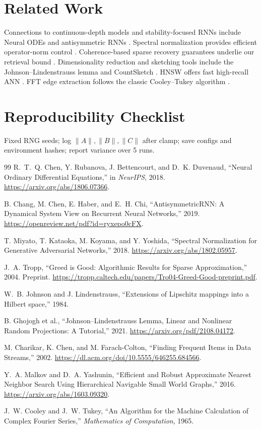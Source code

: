 \documentclass[11pt]{article}
\begin{document}
\section{Related Work}
Connections to continuous-depth models and stability-focused RNNs include Neural ODEs \cite{Chen2018NeuralODE} and antisymmetric RNNs \cite{Chang2019ASRNN}. Spectral normalization provides efficient operator-norm control \cite{Miyato2018SN}. Coherence-based sparse recovery guarantees underlie our retrieval bound \cite{Tropp2004GreedIsGood}. Dimensionality reduction and sketching tools include the Johnson--Lindenstrauss lemma \cite{JL1984,JL_Tutorial2021} and CountSketch \cite{Charikar2002CountSketch}. HNSW offers fast high-recall ANN \cite{Malkov2016HNSW}. FFT edge extraction follows the classic Cooley--Tukey algorithm \cite{CooleyTukey1965}.

\section{Reproducibility Checklist}
Fixed RNG seeds; log $\|A\|,\|B\|,\|C\|$ after clamp; save configs and environment hashes; report variance over 5 runs.

\begin{thebibliography}{99}
 R.~T.~Q. Chen, Y. Rubanova, J. Bettencourt, and D.~K. Duvenaud, ``Neural Ordinary Differential Equations,'' in \emph{NeurIPS}, 2018. \url{https://arxiv.org/abs/1806.07366}.

 B. Chang, M. Chen, E. Haber, and E.~H. Chi, ``AntisymmetricRNN: A Dynamical System View on Recurrent Neural Networks,'' 2019. \url{https://openreview.net/pdf?id=ryxepo0cFX}.

 T. Miyato, T. Kataoka, M. Koyama, and Y. Yoshida, ``Spectral Normalization for Generative Adversarial Networks,'' 2018. \url{https://arxiv.org/abs/1802.05957}.

 J.~A. Tropp, ``Greed is Good: Algorithmic Results for Sparse Approximation,'' 2004. Preprint. \url{https://tropp.caltech.edu/papers/Tro04-Greed-Good-preprint.pdf}.

 W.~B. Johnson and J. Lindenstrauss, ``Extensions of Lipschitz mappings into a Hilbert space,'' 1984.

 B. Ghojogh et al., ``Johnson--Lindenstrauss Lemma, Linear and Nonlinear Random Projections: A Tutorial,'' 2021. \url{https://arxiv.org/pdf/2108.04172}.

 M. Charikar, K. Chen, and M. Farach-Colton, ``Finding Frequent Items in Data Streams,'' 2002. \url{https://dl.acm.org/doi/10.5555/646255.684566}.

 Y.~A. Malkov and D.~A. Yashunin, ``Efficient and Robust Approximate Nearest Neighbor Search Using Hierarchical Navigable Small World Graphs,'' 2016. \url{https://arxiv.org/abs/1603.09320}.

 J.~W. Cooley and J.~W. Tukey, ``An Algorithm for the Machine Calculation of Complex Fourier Series,'' \emph{Mathematics of Computation}, 1965.
\end{thebibliography}
\end{document}
